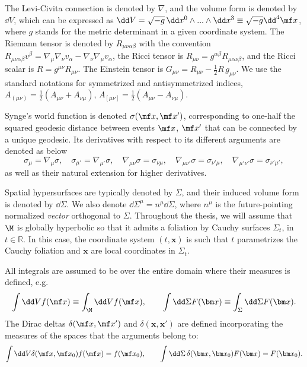 The Levi-Civita connection is denoted by $\nabla$, and the volume form is denoted by $\dd V$, which can be expressed as $\dd V = \sqrt{-g} \,\dd x^0\wedge... \wedge \dd x^3 \equiv \sqrt{-g} \dd^4 \mf x$, where $g$ stands for the metric determinant in a given coordinate system. The Riemann tensor is denoted by $R_{\mu\nu\alpha\beta}$ with the convention {$R_{\mu\nu\alpha\beta}v^\beta = \nabla_\mu \nabla_\nu v_\alpha - \nabla_\nu \nabla_\mu v_\alpha$}, the Ricci tensor is $R_{\mu\nu} = g^{\alpha\beta} R_{\mu\alpha\nu \beta}$, and the Ricci scalar is $R  = g^{\mu\nu}R_{\mu\nu}$. The Einstein tensor is $G_{\mu\nu} = R_{\mu\nu} - \tfrac{1}{2} R\, g_{\mu\nu}$. We use the standard notations for symmetrized and antisymmetrized indices, $A_{(\mu\nu)} = \tfrac{1}{2}(A_{\mu\nu} + A_{\nu\mu})$, $A_{[\mu\nu]} = \tfrac{1}{2}(A_{\mu\nu} - A_{\nu\mu})$.


Synge's world function is denoted $\sigma(\mf x, \mf x')$, corresponding to one-half the squared geodesic distance between events $\mf x$, $\mf x'$ that can be connected by a unique geodesic. Its derivatives with respect to its different arguments are denoted as below
\begin{equation}
    \sigma_\mu = \nabla_\mu \sigma, \quad \sigma_{\mu'} = \nabla_{\mu'}\sigma, \quad \nabla_{\mu\nu}\sigma = \sigma_{\nu\mu}, \quad \nabla_{\mu\nu'}\sigma = \sigma_{\nu'\mu}, \quad \nabla_{\mu'\nu'}\sigma = \sigma_{\nu'\mu'},
\end{equation}
as well as their natural extension for higher derivatives.

Spatial hypersurfaces are typically denoted by $\Sigma$, and their induced volume form is denoted by $\dd \Sigma$. We also denote $\dd\Sigma^\mu = n^\mu \dd \Sigma$, where $n^\mu$ is the future-pointing normalized \textit{vector} orthogonal to $\Sigma$.
Throughout the thesis, we will assume that $\M$ is globally hyperbolic so that it admits a foliation by Cauchy surfaces $\Sigma_t$, in $t\in \mathbb{R}$. In this case, the coordinate system $(t,\bm x)$ is such that $t$ parametrizes the Cauchy foliation and $\bm x$ are local coordinates in $\Sigma_t$.

All integrals are assumed to be over the entire domain where their measures is defined, e.g.
\begin{equation}
    \int\dd V f(\mf x) \equiv \int_{\M}\dd V f(\mf x),\quad\quad \int\dd \Sigma F(\bm x) \equiv \int_{\Sigma}\dd \Sigma F(\bm x).
\end{equation}
The Dirac deltas $\delta(\mf x, \mf x')$ and $\delta(\bm x, \bm x')$ are defined incorporating the measures of the spaces that the arguments belong to:
\begin{equation}
    \int \dd V \delta(\mf x, \mf x_0) f(\mf x) = f(\mf x_0), \quad\quad\int \dd \Sigma\, \delta(\bm x, \bm x_0) F(\bm x) = F(\bm x_0).
\end{equation}


